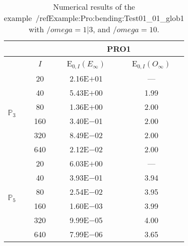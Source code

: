 \begin{table}[H]
\caption{Numerical results of the example~/ref{Example:Pro:bending:Test01_01_glob1} with $/omega=1|3$, and $/omega=10$.}
\setlength{\tabcolsep}{5pt}
\centering
\begin{tabular}{@{}l c c c@{}}
\toprule
 &  & \multicolumn{2}{c}{PRO1}\\
\midrule
 & $I$ & E$_{0,I}(E_{\infty})$ & E$_{0,I}(O_{\infty})$\\
\midrule
\multirow{6}{*}{$\mathbb{P}_{3}$}
 & 20 & 2.16E$+$01 & ---\\
 & 40 & 5.43E$+$00 & 1.99\\
 & 80 & 1.36E$+$00 & 2.00\\
 & 160 & 3.40E$-$01 & 2.00\\
 & 320 & 8.49E$-$02 & 2.00\\
 & 640 & 2.12E$-$02 & 2.00\\
\midrule
\multirow{6}{*}{$\mathbb{P}_{5}$}
 & 20 & 6.03E$+$00 & ---\\
 & 40 & 3.93E$-$01 & 3.94\\
 & 80 & 2.54E$-$02 & 3.95\\
 & 160 & 1.60E$-$03 & 3.99\\
 & 320 & 9.99E$-$05 & 4.00\\
 & 640 & 7.99E$-$06 & 3.65\\
\bottomrule
\end{tabular}
\label{Table:PRO:test_01_01_test34_pro1}
\end{table}
